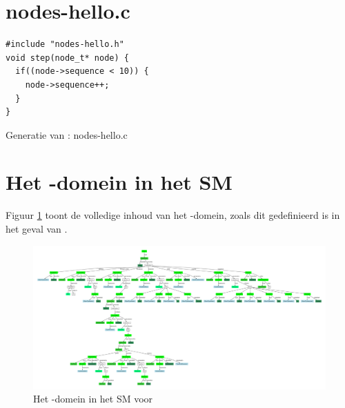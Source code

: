 \section{nodes-hello.c}
\vspace{-5mm}
\begin{listing}[H]
  \begin{verbatim}
#include "nodes-hello.h"
void step(node_t* node) {
  if((node->sequence < 10)) {
    node->sequence++;
  }
}
  \end{verbatim}
  \vspace{-5mm}
  \caption{Generatie van : nodes-hello.c}
\end{listing}

\section{Het -domein in het SM}
\label{section:nodes.sm}

Figuur \ref{fig:nodes.sm} toont de volledige inhoud van het -domein,
zoals dit gedefinieerd is in het geval van .

\begin{figure}[H]
  \centering
  \includegraphics[angle=90,width=0.74\linewidth]{resources/nodes_sm.pdf}
  \caption{Het -domein in het SM voor  }
  \label{fig:nodes.sm}
\end{figure}

